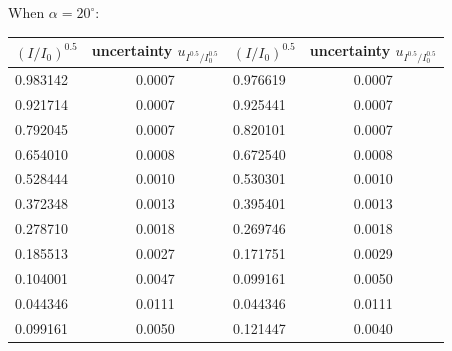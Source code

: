 \documentclass[12pt, a4paper]{article}
\begin{document}
When $\alpha = 20^{\circ}$:
\begin{table}[H]
	\centering
	\begin{tabular}{|l|cl|l|cl|}
	\hline
	$(I/I_0)^{0.5}$ & \multicolumn{2}{c|}{uncertainty   $u_{I^{0.5}/I_0^{0.5}}$} & $(I/I_0)^{0.5}$ & \multicolumn{2}{c|}{uncertainty   $u_{I^{0.5}/I_0^{0.5}}$} \\ \hline
	0.983142        & \multicolumn{2}{c|}{0.0007}                                & 0.976619        & \multicolumn{2}{c|}{0.0007}                                \\ \hline
	0.921714        & \multicolumn{2}{c|}{0.0007}                                & 0.925441        & \multicolumn{2}{c|}{0.0007}                                \\ \hline
	0.792045        & \multicolumn{2}{c|}{0.0007}                                & 0.820101        & \multicolumn{2}{c|}{0.0007}                                \\ \hline
	0.654010        & \multicolumn{2}{c|}{0.0008}                                & 0.672540        & \multicolumn{2}{c|}{0.0008}                                \\ \hline
	0.528444        & \multicolumn{2}{c|}{0.0010}                                & 0.530301        & \multicolumn{2}{c|}{0.0010}                                \\ \hline
	0.372348        & \multicolumn{2}{c|}{0.0013}                                & 0.395401        & \multicolumn{2}{c|}{0.0013}                                \\ \hline
	0.278710        & \multicolumn{2}{c|}{0.0018}                                & 0.269746        & \multicolumn{2}{c|}{0.0018}                                \\ \hline
	0.185513        & \multicolumn{2}{c|}{0.0027}                                & 0.171751        & \multicolumn{2}{c|}{0.0029}                                \\ \hline
	0.104001        & \multicolumn{2}{c|}{0.0047}                                & 0.099161        & \multicolumn{2}{c|}{0.0050}                                \\ \hline
	0.044346        & \multicolumn{2}{c|}{0.0111}                                & 0.044346        & \multicolumn{2}{c|}{0.0111}                                \\ \hline
	0.099161        & \multicolumn{2}{c|}{0.0050}                                & 0.121447        & \multicolumn{2}{c|}{0.0040}                                \\ \hline

\end{tabular}
\end{table}
\end{document}
